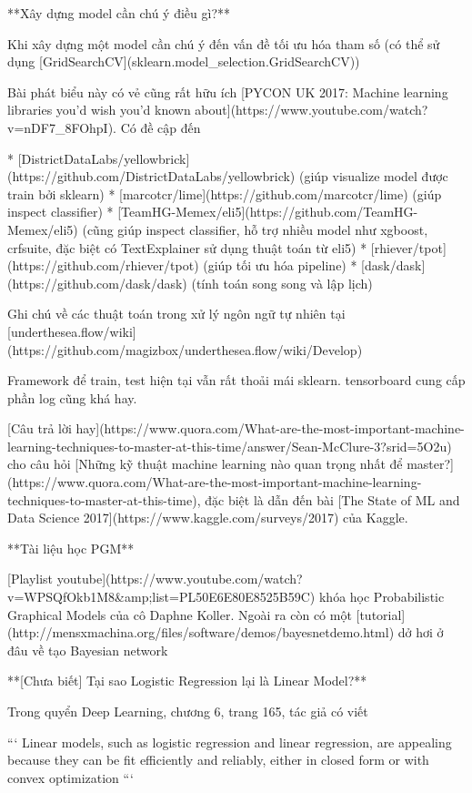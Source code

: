 **Xây dựng model cần chú ý điều gì?**

Khi xây dựng một model cần chú ý đến vấn đề tối ưu hóa tham số (có thể sử dụng [GridSearchCV](sklearn.model_selection.GridSearchCV))

Bài phát biểu này có vẻ cũng rất hữu ích [PYCON UK 2017: Machine learning libraries you'd wish you'd known about](https://www.youtube.com/watch?v=nDF7_8FOhpI). Có đề cập đến

* [DistrictDataLabs/yellowbrick](https://github.com/DistrictDataLabs/yellowbrick) (giúp visualize model được train bởi sklearn)
* [marcotcr/lime](https://github.com/marcotcr/lime) (giúp inspect classifier)
* [TeamHG-Memex/eli5](https://github.com/TeamHG-Memex/eli5) (cũng giúp inspect classifier, hỗ trợ nhiều model như xgboost, crfsuite, đặc biệt có TextExplainer sử dụng thuật toán từ eli5)
* [rhiever/tpot](https://github.com/rhiever/tpot) (giúp tối ưu hóa pipeline)
* [dask/dask](https://github.com/dask/dask) (tính toán song song và lập lịch)

Ghi chú về các thuật toán trong xử lý ngôn ngữ tự nhiên tại [underthesea.flow/wiki](https://github.com/magizbox/underthesea.flow/wiki/Develop)

Framework để train, test hiện tại vẫn rất thoải mái sklearn. tensorboard cung cấp phần log cũng khá hay.

[Câu trả lời hay](https://www.quora.com/What-are-the-most-important-machine-learning-techniques-to-master-at-this-time/answer/Sean-McClure-3?srid=5O2u) cho câu hỏi [Những kỹ thuật machine learning nào quan trọng nhất để master?](https://www.quora.com/What-are-the-most-important-machine-learning-techniques-to-master-at-this-time), đặc biệt là dẫn đến bài [The State of ML and Data Science 2017](https://www.kaggle.com/surveys/2017) của Kaggle.

**Tài liệu học PGM**

[Playlist youtube](https://www.youtube.com/watch?v=WPSQfOkb1M8&amp;list=PL50E6E80E8525B59C) khóa học Probabilistic Graphical Models của cô Daphne Koller. Ngoài ra còn có một [tutorial](http://mensxmachina.org/files/software/demos/bayesnetdemo.html) dở hơi ở đâu về tạo Bayesian network

**[Chưa biết] Tại sao Logistic Regression lại là Linear Model?**

Trong quyển Deep Learning, chương 6, trang 165, tác giả có viết

```
Linear models, such as logistic regression and linear
regression, are appealing because they can be ﬁt
eﬃciently and reliably, either in closed form or
with convex optimization
```

